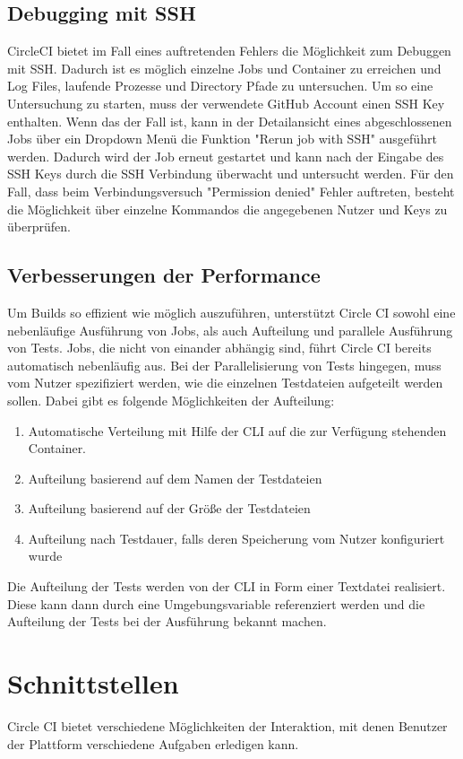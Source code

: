 \documentclass[11pt]{article}
\begin{document}
\subsection{Debugging mit SSH}
CircleCI bietet im Fall eines auftretenden Fehlers die Möglichkeit zum Debuggen mit SSH. Dadurch ist es 
möglich einzelne Jobs und Container zu erreichen und Log Files, laufende Prozesse und Directory Pfade zu 
untersuchen. Um so eine Untersuchung zu starten, muss der verwendete GitHub Account einen SSH Key enthalten.
Wenn das der Fall ist, kann in der Detailansicht eines abgeschlossenen Jobs über ein Dropdown Menü die Funktion
"Rerun job with SSH" ausgeführt werden. Dadurch wird der Job erneut gestartet und kann nach der Eingabe des 
SSH Keys durch die SSH Verbindung überwacht und untersucht werden. Für den Fall, dass beim Verbindungsversuch
"Permission denied" Fehler auftreten, besteht die Möglichkeit über einzelne Kommandos die angegebenen Nutzer 
und Keys zu überprüfen.

\subsection{Verbesserungen der Performance}
Um Builds so effizient wie möglich auszuführen, unterstützt Circle CI sowohl eine nebenläufige Ausführung von Jobs, als auch Aufteilung und parallele Ausführung von Tests. Jobs, die nicht von einander abhängig sind, führt Circle CI bereits automatisch nebenläufig aus. Bei der Parallelisierung von Tests hingegen, muss vom Nutzer spezifiziert werden, wie die einzelnen Testdateien aufgeteilt werden sollen. Dabei gibt es folgende Möglichkeiten der Aufteilung:
\begin{enumerate}
	\item Automatische Verteilung mit Hilfe der CLI auf die zur Verfügung stehenden Container.
    \item Aufteilung basierend auf dem Namen der Testdateien
    \item Aufteilung basierend auf der Größe der Testdateien
    \item Aufteilung nach Testdauer, falls deren Speicherung vom Nutzer konfiguriert wurde
\end{enumerate}
Die Aufteilung der Tests werden von der CLI in Form einer Textdatei realisiert. Diese kann dann durch eine Umgebungsvariable referenziert werden und die Aufteilung der Tests bei der Ausführung bekannt machen.

\section{Schnittstellen}
Circle CI bietet verschiedene Möglichkeiten der Interaktion, mit denen Benutzer der Plattform verschiedene Aufgaben erledigen kann.
\end{document}
